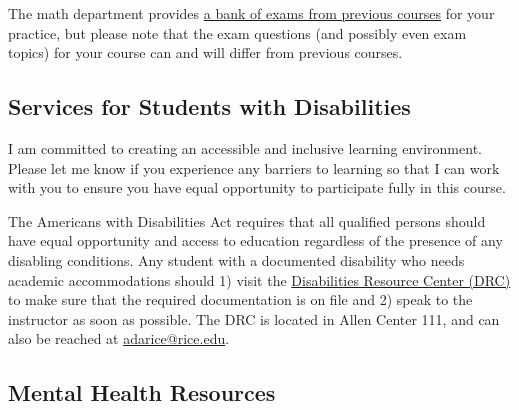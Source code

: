 \documentclass[11pt]{article}
\begin{document}
The math department provides \href{https://mathweb.rice.edu/exam-help}{a bank of exams from previous courses} for your practice, but please note that the exam questions (and possibly even exam topics) for your course can and will differ from previous courses.




\subsection{Services for Students with Disabilities}
I am committed to creating an accessible and inclusive learning environment. Please let me know if you experience any barriers to learning so that I can work with you to ensure you have equal opportunity to participate fully in this course. 

The Americans with Disabilities Act requires that all qualified persons should have equal opportunity and access to education regardless of the presence of any disabling conditions. Any student with a documented disability who needs academic accommodations should 1) visit the \href{https://drc.rice.edu/}{Disabilities Resource Center (DRC)} to make sure that the required documentation is on file and 2) speak to the instructor as soon as possible. The DRC is located in Allen Center 111, and can also be reached at \href{mailto:adarice@rice.edu}{adarice@rice.edu}.

\subsection{Mental Health Resources}
\end{document}
